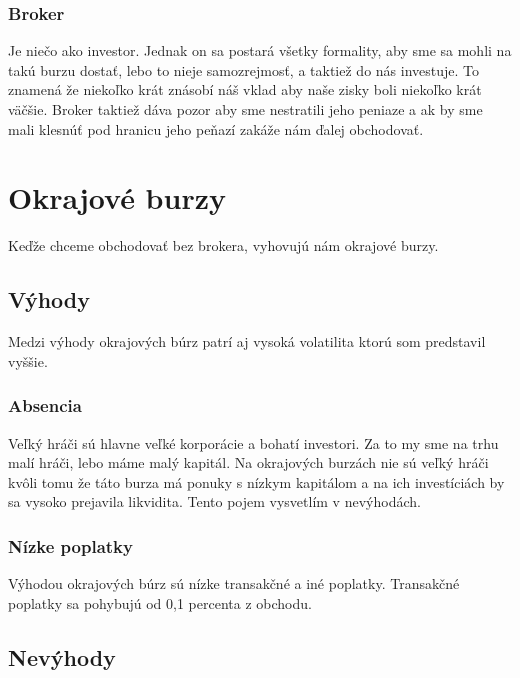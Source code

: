 \subsubsection{Broker} 
Je niečo ako investor. Jednak on sa postará všetky formality, aby sme sa mohli na takú burzu dostať, lebo to nieje samozrejmosť, a taktiež do nás investuje. To znamená že niekoľko krát znásobí náš vklad aby naše zisky boli niekoľko krát väčšie. Broker taktiež dáva pozor aby sme nestratili jeho peniaze a ak by sme mali klesnúť pod hranicu jeho peňazí zakáže nám ďalej obchodovať. \cite{ZAC}  
\section{Okrajové burzy}
Keďže chceme obchodovať bez brokera, vyhovujú nám okrajové burzy.
\subsection{Výhody} 
Medzi výhody okrajových búrz patrí aj vysoká volatilita ktorú som predstavil vyššie.
\subsubsection{Absencia } 
Veľký hráči\cite{ZAC} sú hlavne veľké korporácie a bohatí investori. Za to my sme na trhu malí hráči, lebo máme malý kapitál. Na okrajových burzách nie sú veľký hráči kvôli tomu že táto burza má ponuky s nízkym kapitálom a na ich investíciách by sa vysoko prejavila likvidita. Tento pojem vysvetlím v nevýhodách.
\subsubsection{Nízke poplatky} 
Výhodou okrajových búrz sú nízke transakčné a iné poplatky. Transakčné poplatky sa pohybujú od 0,1 percenta z obchodu. 
\subsection{Nevýhody} 
